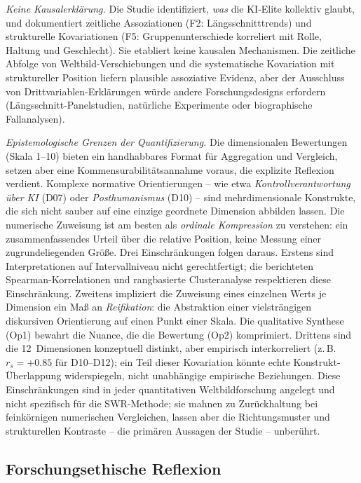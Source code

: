 \documentclass[12pt,a4paper]{article}
\begin{document}
\emph{Keine Kausalerklärung.} Die Studie identifiziert, \emph{was} die KI-Elite kollektiv glaubt, und dokumentiert zeitliche Assoziationen (F2: Längsschnitttrends) und strukturelle Kovariationen (F5: Gruppenunterschiede korreliert mit Rolle, Haltung und Geschlecht). Sie etabliert keine kausalen Mechanismen. Die zeitliche Abfolge von Weltbild-Verschiebungen und die systematische Kovariation mit struktureller Position liefern plausible assoziative Evidenz, aber der Ausschluss von Drittvariablen-Erklärungen würde andere Forschungsdesigns erfordern (Längsschnitt-Panelstudien, natürliche Experimente oder biographische Fallanalysen).

\emph{Epistemologische Grenzen der Quantifizierung.} Die dimensionalen Bewertungen (Skala 1--10) bieten ein handhabbares Format für Aggregation und Vergleich, setzen aber eine Kommensurabilitätsannahme voraus, die explizite Reflexion verdient. Komplexe normative Orientierungen -- wie etwa \emph{Kontrollverantwortung über KI} (D07) oder \emph{Posthumanismus} (D10) -- sind mehrdimensionale Konstrukte, die sich nicht sauber auf eine einzige geordnete Dimension abbilden lassen. Die numerische Zuweisung ist am besten als \emph{ordinale Kompression} zu verstehen: ein zusammenfassendes Urteil über die relative Position, keine Messung einer zugrundeliegenden Größe. Drei Einschränkungen folgen daraus. Erstens sind Interpretationen auf Intervallniveau nicht gerechtfertigt; die berichteten Spearman-Korrelationen und rangbasierte Clusteranalyse respektieren diese Einschränkung. Zweitens impliziert die Zuweisung eines einzelnen Werts je Dimension ein Maß an \emph{Reifikation}: die Abstraktion einer vielsträngigen diskursiven Orientierung auf einen Punkt einer Skala. Die qualitative Synthese (Op1) bewahrt die Nuance, die die Bewertung (Op2) komprimiert. Drittens sind die 12~Dimensionen konzeptuell distinkt, aber empirisch interkorreliert (z.\,B.\ $r_s = +0.85$ für D10--D12); ein Teil dieser Kovariation könnte echte Konstrukt-Überlappung widerspiegeln, nicht unabhängige empirische Beziehungen. Diese Einschränkungen sind in jeder quantitativen Weltbildforschung angelegt und nicht spezifisch für die SWR-Methode; sie mahnen zu Zurückhaltung bei feinkörnigen numerischen Vergleichen, lassen aber die Richtungsmuster und strukturellen Kontraste -- die primären Aussagen der Studie -- unberührt.

\subsection{Forschungsethische Reflexion}
\end{document}
